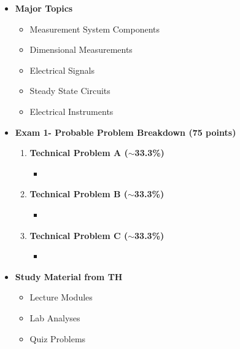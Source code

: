 \documentclass[11pt]{article}
\newcommand{\EXAMNUM}{1\hspace{0mm}}
\begin{document}
\begin{itemize}
\item\textbf{\Large Major Topics}\\
	\begin{itemize}

		\item  {\large Measurement System Components}
		\item  {\large Dimensional Measurements}
		\item  {\large Electrical Signals}
		\item  {\large Steady State Circuits}
		\item  {\large Electrical Instruments}

	\end{itemize}


%
\item  \textbf{\Large Exam \EXAMNUM  - Probable Problem Breakdown (75 points) }\\
\Large
	\begin{enumerate}


		\item  \textbf{\Large Technical Problem A ($\sim$33.3\%)}\\
		\begin{itemize}
			\item 
		\end{itemize}
		\item  \textbf{\Large Technical Problem B ($\sim$33.3\%)}\\
		\begin{itemize}
			\item 
		\end{itemize}
		\item  \textbf{\Large Technical Problem C ($\sim$33.3\%)}\\
		\begin{itemize}
			\item 

		\end{itemize}

	\end{enumerate}

\item  \textbf{\Large Study Material from TH}\\
\begin{itemize}

\item Lecture Modules

\item Lab Analyses 

\item Quiz Problems

\end{itemize}

\end{itemize}


	
\end{document}
